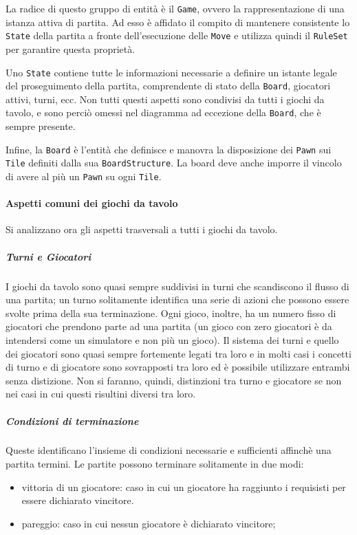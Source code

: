 La radice di questo gruppo di entità è il \texttt{Game}, ovvero la rappresentazione di una istanza attiva di partita.
%
Ad esso è affidato il compito di mantenere consistente lo \texttt{State} della partita a fronte dell'esecuzione delle \texttt{Move} e utilizza quindi il \texttt{RuleSet} per garantire questa proprietà.

Uno \texttt{State} contiene tutte le informazioni necessarie a definire un istante legale del proseguimento della partita, comprendente di stato della \texttt{Board}, giocatori attivi, turni, ecc.
%
Non tutti questi aspetti sono condivisi da tutti i giochi da tavolo, e sono perciò omessi nel diagramma ad eccezione della \texttt{Board}, che è sempre presente.

Infine, la \texttt{Board} è l'entità che definisce e manovra la disposizione dei \texttt{Pawn} sui \texttt{Tile} definiti dalla sua \texttt{BoardStructure}.
%
La board deve anche imporre il vincolo di avere al più un \texttt{Pawn} su ogni \texttt{Tile}.

\paragraph{Aspetti comuni dei giochi da tavolo}
%
Si analizzano ora gli aspetti trasversali a tutti i giochi da tavolo.
%
\subparagraph{Turni e Giocatori}
%
I giochi da tavolo sono quasi sempre suddivisi in turni che scandiscono il flusso di una partita; un turno solitamente identifica una serie di azioni che possono essere svolte prima della sua terminazione.
%
Ogni gioco, inoltre, ha un numero fisso di giocatori che prendono parte ad una partita (un gioco con zero giocatori è da intendersi come un simulatore e non più un gioco).
%
Il sistema dei turni e quello dei giocatori sono quasi sempre fortemente legati tra loro e in molti casi i concetti di turno e di giocatore sono sovrapposti tra loro ed è possibile utilizzare entrambi senza distizione.
%
Non si faranno, quindi, distinzioni tra turno e giocatore se non nei casi in cui questi risultini diversi tra loro.
%
\subparagraph{Condizioni di terminazione}
%
Queste identificano l'insieme di condizioni necessarie e sufficienti affinchè una partita termini.
%
Le partite possono terminare solitamente in due modi:
\begin{itemize}
  \item vittoria di un giocatore: caso in cui un giocatore ha raggiunto i requisisti per essere dichiarato vincitore.
  \item pareggio: caso in cui nessun giocatore è dichiarato vincitore;
\end{itemize}

